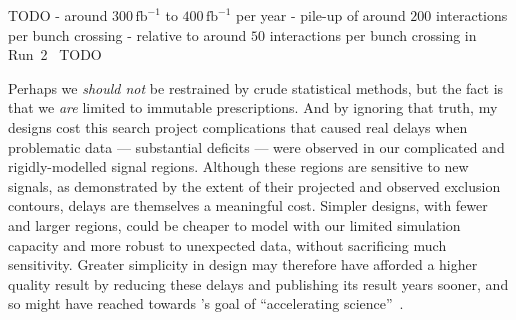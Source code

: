 TODO
- around $300\,\mathrm{fb}^{-1}$ to $400\,\mathrm{fb}^{-1}$ per year
- pile-up of around $200$ interactions per bunch crossing
- relative to around $50$ interactions per bunch crossing in Run~2~\cite{ATLAS:2022hro}
TODO~\cite{ZurbanoFernandez:2020cco}

Perhaps we \emph{should not} be restrained by crude statistical
methods, but the fact is that we \emph{are} limited to immutable prescriptions.
And by ignoring that truth, my designs cost this search project complications
that caused real delays when problematic data
--- substantial deficits ---
were observed in our complicated and rigidly-modelled signal regions.
Although these regions are sensitive to new signals, as demonstrated by the
extent of their projected and observed exclusion contours, delays are
themselves a meaningful cost.
Simpler designs, with fewer and larger regions, could be cheaper to model with
our limited simulation capacity and more robust to unexpected data, without
sacrificing much sensitivity.
Greater simplicity in design may therefore have afforded a higher quality
result by reducing these delays and publishing its result years sooner,
and so might have reached towards \cern's goal of
``accelerating science''~\cite{Radford:1551933}.

